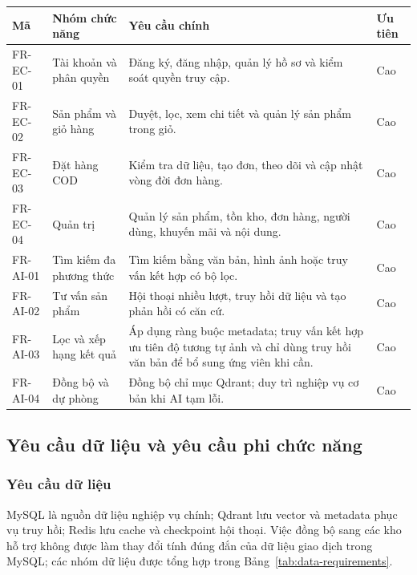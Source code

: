 \begin{breakabletable}
    \centering
    \small
    \caption{Tổng hợp yêu cầu chức năng chính}
    \label{tab:functional-requirements-summary}
    \begin{tabularx}{\textwidth}{|p{}|p{}|X|p{}|}
        \hline
        \textbf{Mã} & \textbf{Nhóm chức năng} & \textbf{Yêu cầu chính} & \textbf{Ưu tiên} \\ \hline
        FR-EC-01 & Tài khoản và phân quyền & Đăng ký, đăng nhập, quản lý hồ sơ và kiểm soát quyền truy cập. & Cao \\ \hline
        FR-EC-02 & Sản phẩm và giỏ hàng & Duyệt, lọc, xem chi tiết và quản lý sản phẩm trong giỏ. & Cao \\ \hline
        FR-EC-03 & Đặt hàng COD & Kiểm tra dữ liệu, tạo đơn, theo dõi và cập nhật vòng đời đơn hàng. & Cao \\ \hline
        FR-EC-04 & Quản trị & Quản lý sản phẩm, tồn kho, đơn hàng, người dùng, khuyến mãi và nội dung. & Cao \\ \hline
        FR-AI-01 & Tìm kiếm đa phương thức & Tìm kiếm bằng văn bản, hình ảnh hoặc truy vấn kết hợp có bộ lọc. & Cao \\ \hline
        FR-AI-02 & Tư vấn sản phẩm & Hội thoại nhiều lượt, truy hồi dữ liệu và tạo phản hồi có căn cứ. & Cao \\ \hline
        FR-AI-03 & Lọc và xếp hạng kết quả & Áp dụng ràng buộc metadata; truy vấn kết hợp ưu tiên độ tương tự ảnh và chỉ dùng truy hồi văn bản để bổ sung ứng viên khi cần. & Cao \\ \hline
        FR-AI-04 & Đồng bộ và dự phòng & Đồng bộ chỉ mục Qdrant; duy trì nghiệp vụ cơ bản khi AI tạm lỗi. & Cao \\ \hline
    \end{tabularx}
\end{breakabletable}

\subsection{Yêu cầu dữ liệu và yêu cầu phi chức năng}

\subsubsection{Yêu cầu dữ liệu}

MySQL là nguồn dữ liệu nghiệp vụ chính; Qdrant lưu vector và metadata phục vụ
truy hồi; Redis lưu cache và checkpoint hội thoại. Việc đồng bộ sang các kho hỗ
trợ không được làm thay đổi tính đúng đắn của dữ liệu giao dịch trong MySQL;
các nhóm dữ liệu được tổng hợp trong Bảng~\ref{tab:data-requirements}.

